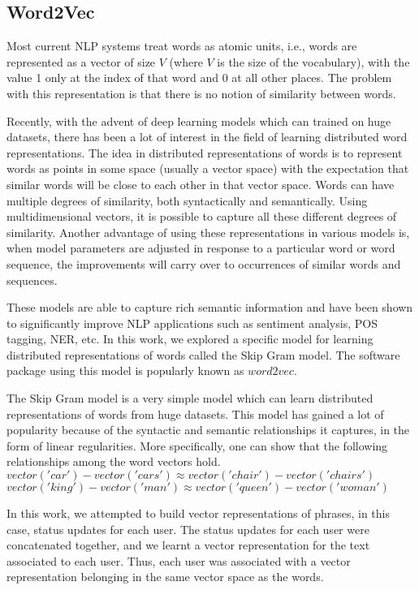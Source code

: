 \subsection{Word2Vec}

Most current NLP systems treat words as atomic units, i.e., words are represented as a vector of size $V$ (where $V$ is the size of the vocabulary), with the value 1 only at the index of that word and 0 at all other places. The problem with this representation is that there is no notion of similarity between words.

Recently, with the advent of deep learning models which can trained on huge datasets, there has been a lot of interest in the field of learning distributed word representations. The idea in distributed representations of words is to represent words as points in some space (usually a vector space) with the expectation that similar words will be close to each other in that vector space. Words can have multiple degrees of similarity, both syntactically and semantically. Using multidimensional vectors, it is possible to capture all these different degrees of similarity. Another advantage of using these representations in various models is, when model parameters are adjusted in response to a particular word or word sequence, the improvements will carry over to occurrences of similar words and sequences.

These models are able to capture rich semantic information and have been shown to significantly improve NLP applications such as sentiment analysis, POS tagging, NER, etc. In this work, we explored a specific model for learning distributed representations of words called the Skip Gram model. The software package using this model is popularly known as $word2vec$.

The Skip Gram model is a very simple model which can learn distributed representations of words from huge datasets. This model has gained a lot of popularity because of the syntactic and semantic relationships it captures, in the form of linear regularities. More specifically, one can show that the following relationships among the word vectors hold. \\
$vector('car') - vector('cars') \approx vector('chair') - vector('chairs')$ \\
$vector('king') - vector('man') \approx vector('queen') - vector('woman')$

In this work, we attempted to build vector representations of phrases, in this case, status updates for each user. The status updates for each user were concatenated together, and we learnt a vector representation for the text associated to each user. Thus, each user was associated with a vector representation belonging in the same vector space as the words.

